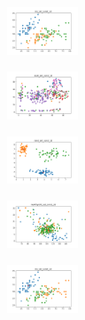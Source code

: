 \begin{figure}[H]
\begin{subfigure}
    \end{subfigure}
    \hfill
    \begin{subfigure}
        \centering
        \includegraphics[width=0.234\textwidth]{img/copkm/iris_set_const_10_589741062_clust.png}
    \end{subfigure}
    \hfill
    \begin{subfigure}
        \centering
        \includegraphics[width=0.234\textwidth]{img/copkm/ecoli_set_const_10_589741062_clust.png}
    \end{subfigure}
    \hfill
    \begin{subfigure}
        \centering
        \includegraphics[width=0.234\textwidth]{img/copkm/rand_set_const_10_589741062_clust.png}
    \end{subfigure}
    \hfill
    \begin{subfigure}
        \centering
        \includegraphics[width=0.234\textwidth]{img/copkm/newthyroid_set_const_10_589741062_clust.png}
    \end{subfigure}
    \hfill
    \begin{subfigure}
        \centering
        \includegraphics[width=0.234\textwidth]{img/copkm/iris_set_const_10_277451237_clust.png}
    \end{subfigure}
    \hfill

\end{figure}
